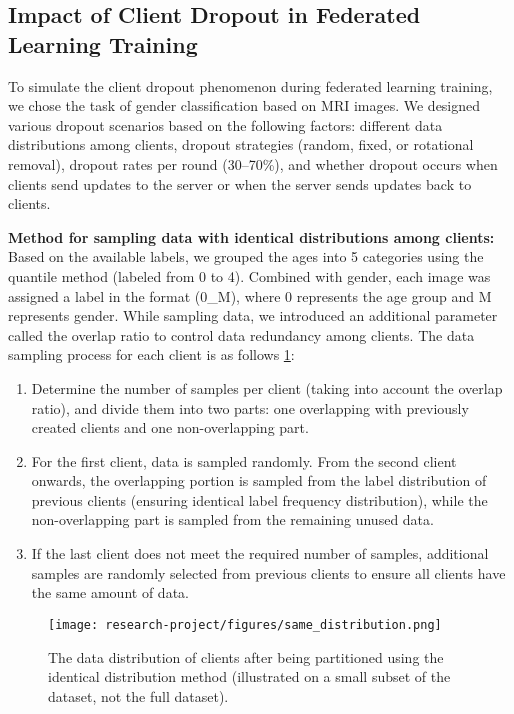 \documentclass[12pt, a4paper]{article}
\begin{document}
\subsection{Impact of Client Dropout in Federated Learning Training}
To simulate the client dropout phenomenon during federated learning training, we chose the task of gender classification based on MRI images. We designed various dropout scenarios based on the following factors: different data distributions among clients, dropout strategies (random, fixed, or rotational removal), dropout rates per round (30–70\%), and whether dropout occurs when clients send updates to the server or when the server sends updates back to clients.

\textbf{Method for sampling data with identical distributions among clients:} Based on the available labels, we grouped the ages into 5 categories using the quantile method (labeled from 0 to 4). Combined with gender, each image was assigned a label in the format (0\_M), where 0 represents the age group and M represents gender. While sampling data, we introduced an additional parameter called the overlap ratio to control data redundancy among clients. The data sampling process for each client is as follows \ref{fig:same_distribution}:

\begin{enumerate}
    \item Determine the number of samples per client (taking into account the overlap ratio), and divide them into two parts: one overlapping with previously created clients and one non-overlapping part.

    \item For the first client, data is sampled randomly. From the second client onwards, the overlapping portion is sampled from the label distribution of previous clients (ensuring identical label frequency distribution), while the non-overlapping part is sampled from the remaining unused data.

    \item If the last client does not meet the required number of samples, additional samples are randomly selected from previous clients to ensure all clients have the same amount of data.
\end{enumerate}

\begin{figure}[H]
    \centering
    \texttt{[image: research-project/figures/same\_distribution.png]}
    \caption{The data distribution of clients after being partitioned using the identical distribution method (illustrated on a small subset of the dataset, not the full dataset).}
    \label{fig:same_distribution}
\end{figure}
\end{document}
